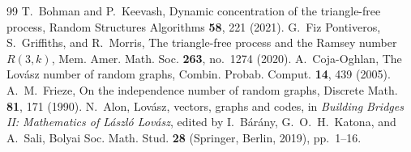 \documentclass[11pt]{article}
\begin{document}
\begin{thebibliography}{99}
 T.~Bohman and P.~Keevash, Dynamic concentration of the triangle-free process, Random Structures Algorithms \textbf{58}, 221 (2021).
 G.~Fiz Pontiveros, S.~Griffiths, and R.~Morris, The triangle-free process and the Ramsey number $R(3,k)$, Mem. Amer. Math. Soc. \textbf{263}, no.~1274 (2020).
 A.~Coja-Oghlan, The Lov\'asz number of random graphs, Combin. Probab. Comput. \textbf{14}, 439 (2005).
 A.~M.~Frieze, On the independence number of random graphs, Discrete Math. \textbf{81}, 171 (1990).
 N.~Alon, Lov\'asz, vectors, graphs and codes, in \emph{Building Bridges II: Mathematics of L\'aszl\'o Lov\'asz}, edited by I.~B\'ar\'any, G.~O.~H.~Katona, and A.~Sali, Bolyai Soc. Math. Stud. \textbf{28} (Springer, Berlin, 2019), pp.~1--16.
\end{thebibliography}
\end{document}
